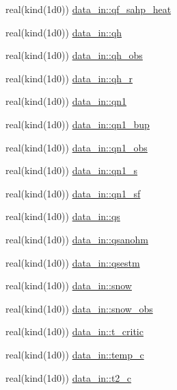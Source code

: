 \begin{DoxyCompactItemize}
\item 
real(kind(1d0)) \hyperlink{namespacedata__in_a3606d0dc641d4f68851d608bec320422}{data\+\_\+in\+::qf\+\_\+sahp\+\_\+heat}
\item 
real(kind(1d0)) \hyperlink{namespacedata__in_ade512e4aad4c64404e1c974241c965e7}{data\+\_\+in\+::qh}
\item 
real(kind(1d0)) \hyperlink{namespacedata__in_a333bca61a59b05a5a5db0c7bb9daa2b9}{data\+\_\+in\+::qh\+\_\+obs}
\item 
real(kind(1d0)) \hyperlink{namespacedata__in_a7144dc07db9d95f72aedabd88c44bf99}{data\+\_\+in\+::qh\+\_\+r}
\item 
real(kind(1d0)) \hyperlink{namespacedata__in_ae6fa09bb6b28e70653d0957e003b6f57}{data\+\_\+in\+::qn1}
\item 
real(kind(1d0)) \hyperlink{namespacedata__in_a7c4bf0a5d9721f577e74c835d3513036}{data\+\_\+in\+::qn1\+\_\+bup}
\item 
real(kind(1d0)) \hyperlink{namespacedata__in_ae357494342c4cf48a962c4361d7c4459}{data\+\_\+in\+::qn1\+\_\+obs}
\item 
real(kind(1d0)) \hyperlink{namespacedata__in_ae21258de695f82699606f7ced498693d}{data\+\_\+in\+::qn1\+\_\+s}
\item 
real(kind(1d0)) \hyperlink{namespacedata__in_af270ed598adad800b8338f7a0700183f}{data\+\_\+in\+::qn1\+\_\+sf}
\item 
real(kind(1d0)) \hyperlink{namespacedata__in_aade22df4a22fe3872701ac9b6f7fed21}{data\+\_\+in\+::qs}
\item 
real(kind(1d0)) \hyperlink{namespacedata__in_ac47d3ea5084c2019b69f3fe0b7ae4454}{data\+\_\+in\+::qsanohm}
\item 
real(kind(1d0)) \hyperlink{namespacedata__in_a4c71a7e3c5a99b333e25a1876a3968b1}{data\+\_\+in\+::qsestm}
\item 
real(kind(1d0)) \hyperlink{namespacedata__in_a4e7d05b463b07d80dfb5d3d65aea03e2}{data\+\_\+in\+::snow}
\item 
real(kind(1d0)) \hyperlink{namespacedata__in_ac93d21776972756112d04651ac3cbb22}{data\+\_\+in\+::snow\+\_\+obs}
\item 
real(kind(1d0)) \hyperlink{namespacedata__in_aafa124a0fedbdd3fd681dc1de7da58f1}{data\+\_\+in\+::t\+\_\+critic}
\item 
real(kind(1d0)) \hyperlink{namespacedata__in_aaac1000f5b2d5c88466c307795518d4c}{data\+\_\+in\+::temp\+\_\+c}
\item 
real(kind(1d0)) \hyperlink{namespacedata__in_a4bb1b5c9961c3b92df299792352bed5b}{data\+\_\+in\+::t2\+\_\+c}

\end{DoxyCompactItemize}

